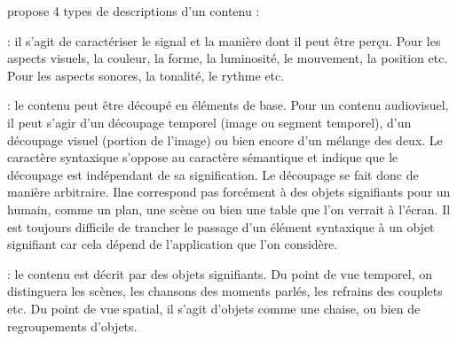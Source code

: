 \cite{ThiBui2003} propose 4 types de descriptions d'un contenu :
\begin{liste}
	\item {} : il s'agit de caractériser le signal et la manière dont il peut être perçu.
	Pour les aspects visuels, la couleur, la forme, la luminosité, le mouvement, la position etc.
	Pour les aspects sonores, la tonalité, le rythme etc.
   
	\item {} : le contenu peut être découpé en éléments de base. 
	Pour un contenu audiovisuel, il peut s'agir d'un découpage temporel (image ou segment temporel), d'un découpage visuel (portion de l'image) ou bien encore d'un mélange des deux.
	Le caractère syntaxique s'oppose au caractère sémantique et indique que le découpage est indépendant de sa signification. 
	Le découpage se fait donc de manière arbitraire. 
	Ilne correspond pas forcément à des objets signifiants pour un humain, comme un plan, une scène ou bien une table que l'on verrait à l'écran.
	Il est toujours difficile de trancher le passage d'un élément syntaxique à un objet signifiant car cela dépend de l'application que l'on considère. 

	\item {} : le contenu est décrit par des objets signifiants. 
	Du point de vue temporel, on distinguera les scènes, les chansons des moments parlés, les refrains des couplets etc.
	Du point de vue spatial, il s'agit d'objets comme une chaise, ou bien de regroupements d'objets.

	\item {} 
\end{liste}



 

